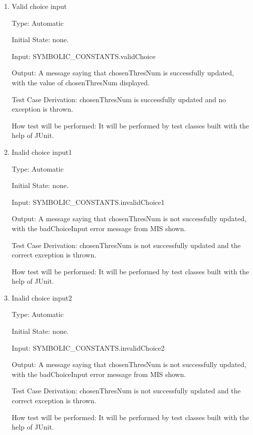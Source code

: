 \documentclass[12pt, titlepage]{article}
\begin{document}
\begin{enumerate}

\item{Valid choice input\\}

Type: Automatic
					
Initial State: none.
					
Input: SYMBOLIC\_CONSTANTS.validChoice
					
Output: A message saying that chosenThresNum is successfully updated, with the
value of chosenThresNum displayed.

Test Case Derivation: chosenThresNum is successfully updated and no exception is
thrown.

How test will be performed: It will be performed by test classes built with the
help of JUnit.
					
\item{Inalid choice input1\\}

Type: Automatic
					
Initial State: none.
					
Input: SYMBOLIC\_CONSTANTS.invalidChoice1
					
Output: A message saying that chosenThresNum is not successfully updated, with
the badChoiceInput error message from MIS shown.

Test Case Derivation: chosenThresNum is not successfully updated and the correct
exception is thrown.

How test will be performed: It will be performed by test classes built with the
help of JUnit.

\item{Inalid choice input2\\}

Type: Automatic
					
Initial State: none.
					
Input: SYMBOLIC\_CONSTANTS.invalidChoice2
					
Output: A message saying that chosenThresNum is not successfully updated, with
the badChoiceInput error message from MIS shown.

Test Case Derivation: chosenThresNum is not successfully updated and the correct
exception is thrown.

How test will be performed: It will be performed by test classes built with the
help of JUnit.

\end{enumerate}
\end{document}
